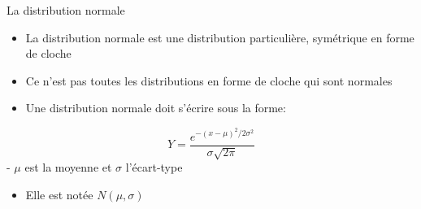 \documentclass[ignorenonframetext,]{beamer}
\providecommand{\tightlist}{%
  \setlength{\itemsep}{0pt}\setlength{\parskip}{0pt}}
\begin{document}
\begin{frame}{La distribution normale}

\begin{itemize}
\tightlist
\item
  La distribution normale est une distribution particulière, symétrique
  en forme de cloche
\item
  Ce n'est pas toutes les distributions en forme de cloche qui sont
  normales
\item
  Une distribution normale doit s'écrire sous la forme:
\end{itemize}

\[ Y = \frac{e^{-(x - \mu)^2/2\sigma^2}}{\sigma\sqrt{2\pi}}\] - \(\mu\)
est la moyenne et \(\sigma\) l'écart-type

\begin{itemize}
\tightlist
\item
  Elle est notée \(N(\mu, \sigma)\)
\end{itemize}

\end{frame}
\end{document}
